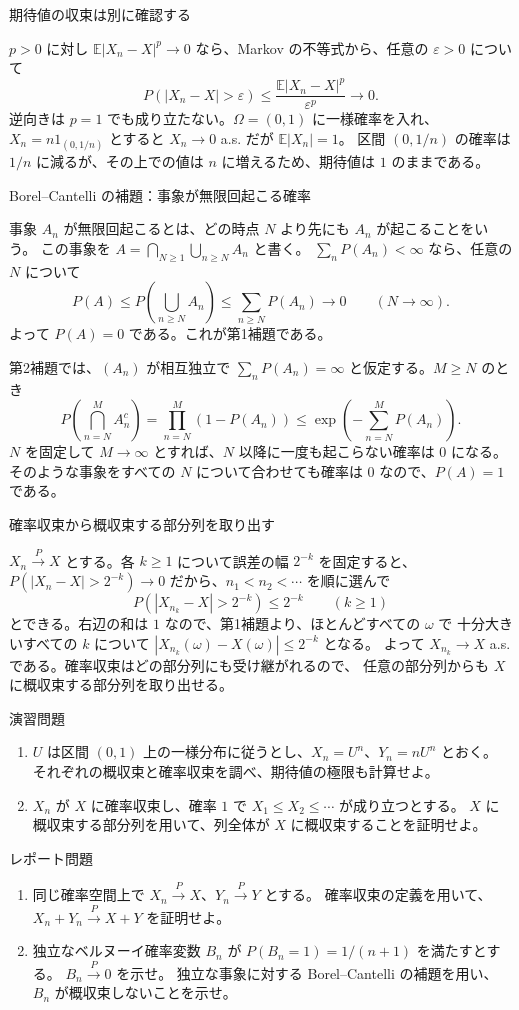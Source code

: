\documentclass[a4paper,10pt,pdflatex,ja=standard,jafont=ipaex-type1,
  magstyle=real,scale=1]{bxjsarticle}
\newcommand{\topic}[1]{\par\vspace{5pt}
  {\large\sffamily\mdseries\color{accent}#1}\par\vspace{2pt}}
\newcommand{\E}{\mathbb E}
\newcommand{\ind}{\mathrm{1}}
\begin{document}
\topic{期待値の収束は別に確認する}
$p>0$ に対し $\E|X_n-X|^p\to0$ なら、Markov の不等式から、任意の $\varepsilon>0$ について
$$P(|X_n-X|>\varepsilon)\le\frac{\E|X_n-X|^p}{\varepsilon^p}\longrightarrow0.$$
逆向きは $p=1$ でも成り立たない。$\Omega=(0,1)$ に一様確率を入れ、$X_n=n\ind_{(0,1/n)}$ とすると
$X_n\to0$ a.s. だが $\E|X_n|=1$。
区間 $(0,1/n)$ の確率は $1/n$ に減るが、その上での値は $n$ に増えるため、期待値は $1$ のままである。

\newpage
\topic{Borel--Cantelli の補題：事象が無限回起こる確率}
事象 $A_n$ が無限回起こるとは、どの時点 $N$ より先にも $A_n$ が起こることをいう。
この事象を $A=\bigcap_{N\ge1}\bigcup_{n\ge N}A_n$ と書く。
$\sum_nP(A_n)<\infty$ なら、任意の $N$ について
$$P(A)\le P\left(\bigcup_{n\ge N}A_n\right)\le\sum_{n\ge N}P(A_n)\longrightarrow0
 \qquad(N\to\infty).$$
よって $P(A)=0$ である。これが第1補題である。

第2補題では、$(A_n)$ が相互独立で $\sum_nP(A_n)=\infty$ と仮定する。$M\ge N$ のとき
$$P\left(\bigcap_{n=N}^M A_n^c\right)
 =\prod_{n=N}^M(1-P(A_n))
 \le\exp\left(-\sum_{n=N}^M P(A_n)\right).$$
$N$ を固定して $M\to\infty$ とすれば、$N$ 以降に一度も起こらない確率は $0$ になる。
そのような事象をすべての $N$ について合わせても確率は $0$ なので、$P(A)=1$ である。

\topic{確率収束から概収束する部分列を取り出す}
$X_n\xrightarrow{P}X$ とする。各 $k\ge1$ について誤差の幅 $2^{-k}$ を固定すると、
$P(|X_n-X|>2^{-k})\to0$ だから、$n_1<n_2<\cdots$ を順に選んで
$$P(|X_{n_k}-X|>2^{-k})\le2^{-k}\qquad(k\ge1)$$
とできる。右辺の和は $1$ なので、第1補題より、ほとんどすべての $\omega$ で
十分大きいすべての $k$ について $|X_{n_k}(\omega)-X(\omega)|\le2^{-k}$ となる。
よって $X_{n_k}\to X$ a.s. である。確率収束はどの部分列にも受け継がれるので、
任意の部分列からも $X$ に概収束する部分列を取り出せる。

\topic{演習問題}
\begin{enumerate}[label=\arabic*.]
\item $U$ は区間 $(0,1)$ 上の一様分布に従うとし、$X_n=U^n$、$Y_n=nU^n$ とおく。
それぞれの概収束と確率収束を調べ、期待値の極限も計算せよ。
\item $X_n$ が $X$ に確率収束し、確率 $1$ で $X_1\le X_2\le\cdots$ が成り立つとする。
$X$ に概収束する部分列を用いて、列全体が $X$ に概収束することを証明せよ。
\end{enumerate}

\topic{レポート問題}
\begin{enumerate}[label=\arabic*.]
\item 同じ確率空間上で $X_n\xrightarrow{P}X$、$Y_n\xrightarrow{P}Y$ とする。
確率収束の定義を用いて、$X_n+Y_n\xrightarrow{P}X+Y$ を証明せよ。
\item 独立なベルヌーイ確率変数 $B_n$ が $P(B_n=1)=1/(n+1)$ を満たすとする。
$B_n\xrightarrow{P}0$ を示せ。
独立な事象に対する Borel--Cantelli の補題を用い、$B_n$ が概収束しないことを示せ。
\end{enumerate}
\end{document}
